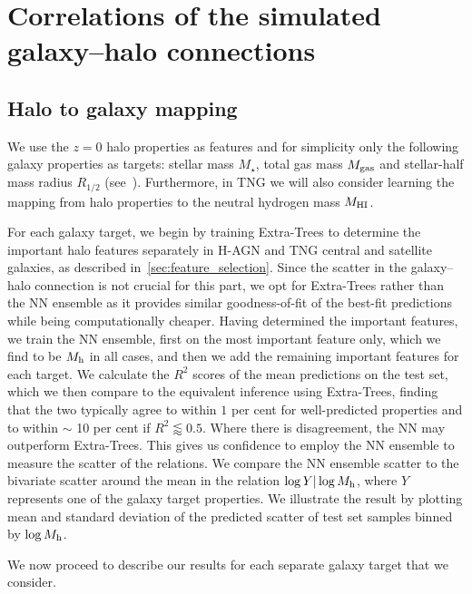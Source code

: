 \documentclass[useAMS,usenatbib]{mnras}
\begin{document}
\section{Correlations of the simulated galaxy--halo connections}\label{sec:Results}

\subsection{Halo to galaxy mapping}\label{sec:halo_to_galaxy}

We use the $z=0$ halo properties as features and for simplicity only the following galaxy properties as targets: stellar mass $M_\star$, total gas mass $M_{\rm gas}$ and stellar-half mass radius $R_{1/2}$ (see~). Furthermore, in TNG we will also consider learning the mapping from halo properties to the neutral hydrogen mass $M_{\rm HI}$.

For each galaxy target, we begin by training Extra-Trees to determine the important halo features separately in H-AGN and TNG central and satellite galaxies, as described in~\cref{sec:feature_selection}. Since the scatter in the galaxy--halo connection is not crucial for this part, we opt for Extra-Trees rather than the NN ensemble as it provides similar goodness-of-fit of the best-fit predictions while being computationally cheaper. Having determined the important features, we train the NN ensemble, first on the most important feature only, which we find to be $M_{\rm h}$ in all cases, and then we add the remaining important features for each target. We calculate the $R^2$ scores of the mean predictions on the test set, which we then compare to the equivalent inference using Extra-Trees, finding that the two typically agree to within $1$ per cent for well-predicted properties and to within $\sim$ 10 per cent if $R^2 \lessapprox 0.5$. Where there is disagreement, the \ac{NN} may outperform Extra-Trees.
This gives us confidence to employ the \ac{NN} ensemble to measure the scatter of the relations. We compare the \ac{NN} ensemble scatter to the bivariate scatter around the mean in the relation $\log Y | \log M_{\rm h}$, where $Y$ represents one of the galaxy target properties. We illustrate the result by plotting mean and standard deviation of the predicted scatter of test set samples binned by $\log M_{\rm h}$.

We now proceed to describe our results for each separate galaxy target that we consider.
\end{document}
